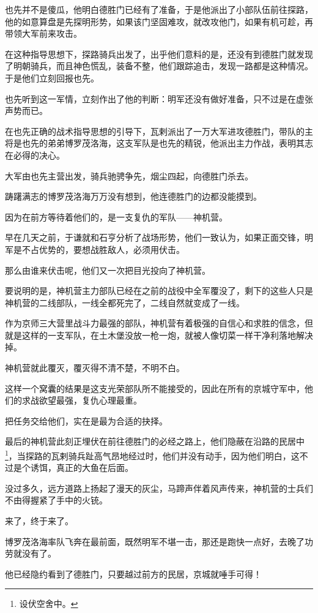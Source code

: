 \begin{multicols}{\theparacolNo}
也先并不是傻瓜，他明白德胜门已经有了准备，于是他派出了小部队伍前往探路，他的如意算盘是先探明形势，如果该门坚固难攻，就改攻他门，如果有机可趁，再带领大军前来攻击。

在这种指导思想下，探路骑兵出发了，出乎他们意料的是，还没有到德胜门就发现了明朝骑兵，而且神色慌乱，装备不整，他们跟踪追击，发现一路都是这种情况。于是他们立刻回报也先。

也先听到这一军情，立刻作出了他的判断：明军还没有做好准备，只不过是在虚张声势而已。

在也先正确的战术指导思想的引导下，瓦剌派出了一万大军进攻德胜门，带队的主将是也先的弟弟博罗茂洛海，这支军队是也先的精锐，他派出主力作战，表明其志在必得的决心。

大军由也先主营出发，骑兵驰骋争先，烟尘四起，向德胜门杀去。

踌躇满志的博罗茂洛海万万没有想到，他连德胜门的边都没能摸到。

因为在前方等待着他们的，是一支复仇的军队——神机营。

早在几天之前，于谦就和石亨分析了战场形势，他们一致认为，如果正面交锋，明军是不占优势的，要想战胜敌人，必须用伏击。

那么由谁来伏击呢，他们又一次把目光投向了神机营。

要说明的是，神机营主力部队已经在之前的战役中全军覆没了，剩下的这些人只是神机营的二线部队，一线全都死完了，二线自然就变成了一线。

作为京师三大营里战斗力最强的部队，神机营有着极强的自信心和求胜的信念，但就是这样的一支军队，在土木堡没放一枪一炮，就被人像切菜一样干净利落地解决掉。

神机营就此覆灭，覆灭得不清不楚，不明不白。

这样一个窝囊的结果是这支光荣部队所不能接受的，因此在所有的京城守军中，他们的求战欲望最强，复仇心理最重。

把任务交给他们，实在是最为合适的抉择。

最后的神机营此刻正埋伏在前往德胜门的必经之路上，他们隐蔽在沿路的民居中\footnote{设伏空舍中。}，当探路的瓦剌骑兵趾高气昂地经过时，他们并没有动手，因为他们明白，这不过是个诱饵，真正的大鱼在后面。

没过多久，远方道路上扬起了漫天的灰尘，马蹄声伴着风声传来，神机营的士兵们不由得握紧了手中的火铳。

来了，终于来了。

博罗茂洛海率队飞奔在最前面，既然明军不堪一击，那还是跑快一点好，去晚了功劳就没有了。

他已经隐约看到了德胜门，只要越过前方的民居，京城就唾手可得！


\end{multicols}
